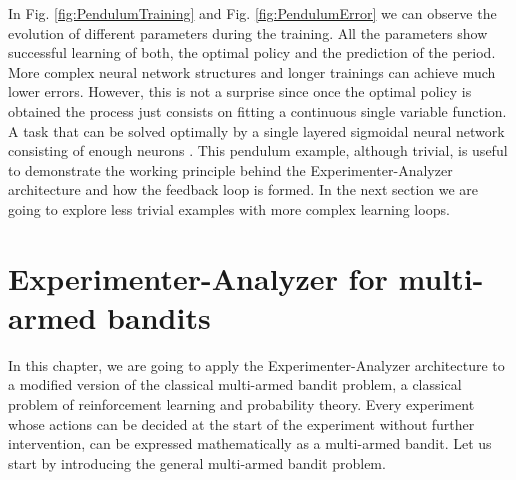 \documentclass[11pt,a4paper,twoside]{report}
\newcommand{\+}{\textnormal{+} }
\theoremstyle{definition}
\numberwithin{equation}{chapter}
\begin{document}
  In Fig. \ref{fig:PendulumTraining} and Fig. \ref{fig:PendulumError} we can
  observe the evolution of different parameters during the training. All the
  parameters show successful learning of both, the optimal policy and the
  prediction of the period. More complex neural network structures and longer
  trainings can achieve much lower errors. However, this is not a surprise since
  once the optimal policy is obtained the process just consists on fitting a
  continuous single variable function. A task that can be solved optimally by a
  single layered sigmoidal neural network consisting of enough neurons
  \cite{cybenko1989approximation}. This pendulum example, although trivial, is
  useful to demonstrate the working principle behind the Experimenter-Analyzer
  architecture and how the feedback loop is formed. In the next section we are
  going to explore less trivial examples with more complex learning loops.

  


\chapter{Experimenter-Analyzer for multi-armed bandits} 
In this chapter, we are going to apply the Experimenter-Analyzer architecture to
a modified version of the classical multi-armed bandit problem, a
classical problem of reinforcement learning and probability theory. Every
experiment whose actions can be decided at the start of the experiment without
further intervention, can be expressed mathematically as a multi-armed bandit.
Let us start by introducing the general multi-armed bandit problem.
\end{document}
